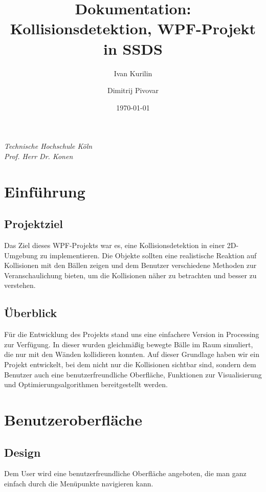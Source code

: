 \documentclass[12pt,a4paper]{article}
\title{Dokumentation: Kollisionsdetektion, WPF-Projekt in SSDS}
\author{Ivan Kurilin \and Dimitrij Pivovar}
\date{\today}
\begin{document}
	\maketitle
	\begin{center}
		\textit{Technische Hochschule Köln }\\		
		\textit{Prof. Herr Dr. Konen}
	\end{center}
	\section{Einführung}	
	\subsection{Projektziel}
	
Das Ziel dieses WPF-Projekts war es, eine Kollisionsdetektion in einer 2D-Umgebung zu implementieren. Die Objekte sollten eine realistische Reaktion auf Kollisionen mit den Bällen zeigen und dem Benutzer verschiedene Methoden zur Veranschaulichung bieten, um die Kollisionen näher zu betrachten und besser zu verstehen.
	
	\subsection{Überblick}
	
Für die Entwicklung des Projekts stand uns eine einfachere Version in Processing zur Verfügung. In dieser wurden gleichmäßig bewegte Bälle im Raum simuliert, die nur mit den Wänden kollidieren konnten. Auf dieser Grundlage haben wir ein Projekt entwickelt, bei dem nicht nur die Kollisionen sichtbar sind, sondern dem Benutzer auch eine benutzerfreundliche Oberfläche, Funktionen zur Visualisierung und Optimierungsalgorithmen bereitgestellt werden.
	
	\section{Benutzeroberfläche}
	\subsection{Design}
	Dem User wird eine benutzerfreundliche Oberfläche angeboten, die man ganz einfach durch die Menüpunkte navigieren kann. 
	
\end{document}
